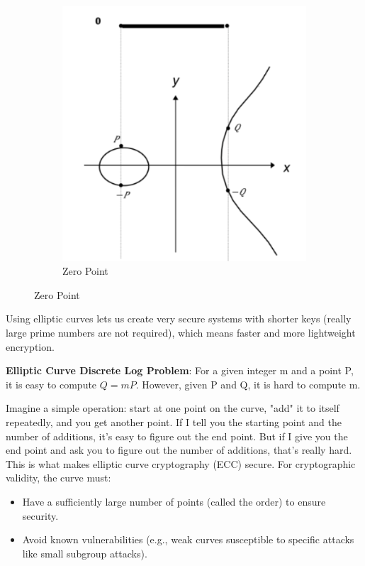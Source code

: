 \begin{figure}[h!]
\begin{subfigure}[b]{0.3\textwidth}
        \includegraphics[width=\linewidth]{img/zeropoint.png}
        \caption{Zero Point}
    \end{subfigure}
\end{figure}

Using elliptic curves lets us create very secure systems with shorter keys (really large prime numbers are not required), which means faster and more lightweight encryption.

\begin{defn}
    \textbf{Elliptic Curve Discrete Log Problem}: For a given integer m and a point P, it is easy to compute $Q = mP$. However, given P and Q, it is hard to compute m.
\end{defn}

Imagine a simple operation: start at one point on the curve, "add" it to itself repeatedly, and you get another point. If I tell you the starting point and the number of additions, it's easy to figure out the end point. But if I give you the end point and ask you to figure out the number of additions, that's really hard. This is what makes elliptic curve cryptography (ECC) secure. For cryptographic validity, the curve must:
\begin{itemize}
    \item Have a sufficiently large number of points (called the order) to ensure security.
    \item Avoid known vulnerabilities (e.g., weak curves susceptible to specific attacks like small subgroup attacks).
\end{itemize}